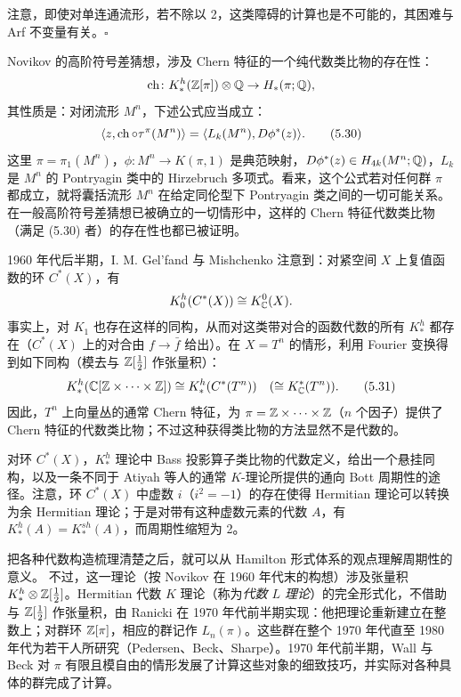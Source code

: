 \begin{remark}
注意，即使对单连通流形，若不除以 2，这类障碍的计算也是不可能的，其困难与 Arf 不变量有关。\hfill$\square$
\end{remark}

Novikov 的高阶符号差猜想，涉及 Chern 特征的一个纯代数类比物的存在性：
\[
\operatorname{ch}\colon K_{*}^{h}(\mathbb{Z}[\pi])\otimes\mathbb{Q}\to H_{*}(\pi;\mathbb{Q}),
\]
其性质是：对闭流形 $M^{n}$，下述公式应当成立：
\begin{equation}
\langle z,\operatorname{ch}\circ\tau^{\pi}(M^{n})\rangle=\langle L_{k}(M^{n}),D\phi^{*}(z)\rangle. \tag{5.30}
\end{equation}
这里 $\pi=\pi_{1}(M^{n})$，$\phi\colon M^{n}\to K(\pi,1)$ 是典范映射，$D\phi^{*}(z)\in H_{4k}(M^{n};\mathbb{Q})$，$L_{k}$ 是 $M^{n}$ 的 Pontryagin 类中的 Hirzebruch 多项式。看来，这个公式若对任何群 $\pi$ 都成立，就将囊括流形 $M^{n}$ 在给定同伦型下 Pontryagin 类之间的一切可能关系。在一般高阶符号差猜想已被确立的一切情形中，这样的 Chern 特征代数类比物（满足 (5.30) 者）的存在性也都已被证明。

1960 年代后半期，I. M. Gel'fand 与 Mishchenko 注意到：对紧空间 $X$ 上复值函数的环 $C^{*}(X)$，有
\[
K_{0}^{h}(C^{*}(X))\cong K_{\mathbb{C}}^{0}(X).
\]
事实上，对 $K_{1}$ 也存在这样的同构，从而对这类带对合的函数代数的所有 $K_{*}^{h}$ 都存在（$C^{*}(X)$ 上的对合由 $f\to\bar f$ 给出）。在 $X=T^{n}$ 的情形，利用 Fourier 变换得到如下同构（模去与 $\mathbb{Z}[\tfrac12]$ 作张量积）：
\begin{equation}
K_{*}^{h}(\mathbb{C}[\mathbb{Z}\times\dots\times\mathbb{Z}])\cong K_{*}^{h}(C^{*}(T^{n}))
\quad(\cong K_{\mathbb{C}}^{*}(T^{n})). \tag{5.31}
\end{equation}
因此，$T^{n}$ 上向量丛的通常 Chern 特征，为 $\pi=\mathbb{Z}\times\dots\times\mathbb{Z}$（$n$ 个因子）提供了 Chern 特征的代数类比物；不过这种获得类比物的方法显然不是代数的。

对环 $C^{*}(X)$，$K_{*}^{h}$ 理论中 Bass 投影算子类比物的代数定义，给出一个悬挂同构，以及一条不同于 Atiyah 等人的通常 $K$-理论所提供的通向 Bott 周期性的途径。注意，环 $C^{*}(X)$ 中虚数 $i$（$i^{2}=-1$）的存在使得 Hermitian 理论可以转换为余 Hermitian 理论；于是对带有这种虚数元素的代数 $A$，有 $K_{*}^{h}(A)=K_{*}^{sh}(A)$，而周期性缩短为 2。

把各种代数构造梳理清楚之后，就可以从 Hamilton 形式体系的观点理解周期性的意义。
不过，这一理论（按 Novikov 在 1960 年代末的构想）涉及张量积 $K_{*}^{h}\otimes\mathbb{Z}[\tfrac12]$。Hermitian 代数 $K$ 理论（称为\emph{代数 $L$ 理论}）的完全形式化，不借助与 $\mathbb{Z}[\tfrac12]$ 作张量积，由 Ranicki 在 1970 年代前半期实现：他把理论重新建立在整数上；对群环 $\mathbb{Z}[\pi]$，相应的群记作 $L_{n}(\pi)$。这些群在整个 1970 年代直至 1980 年代为若干人所研究（Pedersen、Beck、Sharpe）。1970 年代前半期，Wall 与 Beck 对 $\pi$ 有限且模自由的情形发展了计算这些对象的细致技巧，并实际对各种具体的群完成了计算。

